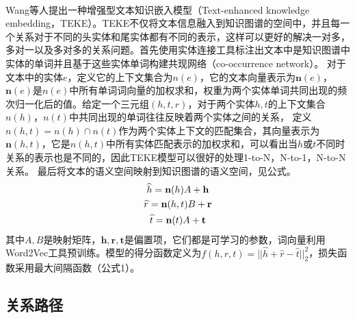\documentclass[twocolumn]{article}
\newcommand{\upcite}[1]{\textsuperscript{\textsuperscript{\cite{#1}}}}
\begin{document}
	Wang等人\upcite{TEKE}提出一种增强型文本知识嵌入模型（Text-enhanced knowledge embedding，TEKE）。TEKE不仅将文本信息融入到知识图谱的空间中，并且每一个关系对于不同的头实体和尾实体都有不同的表示，这样可以更好的解决一对多，多对一以及多对多的关系问题。首先使用实体连接工具标注出文本中是知识图谱中实体的单词并且基于这些实体单词构建共现网络（co-occurrence network）。
	对于文本中的实体$e$，定义它的上下文集合为$n(e)$，它的文本向量表示为$\textbf{n}(e)$，$\textbf{n}(e)$是$n(e)$中所有单词词向量的加权求和，权重为两个实体单词共同出现的频次归一化后的值。给定一个三元组$(h,t,r)$，对于两个实体$h,t$的上下文集合$n(h)$，$n(t)$中共同出现的单词往往反映着两个实体之间的关系，
	定义$n(h,t)=n(h)\cap n(t)$作为两个实体上下文的匹配集合，其向量表示为$\textbf{n}(h,t)$，它是$n(h,t)$中所有实体匹配表示的加权求和，可以看出当$h$或$t$不同时关系的表示也是不同的，因此TEKE模型可以很好的处理1-to-N，N-to-1，N-to-N关系。
	最后将文本的语义空间映射到知识图谱的语义空间，见公式。
	\begin{gather}
		\widehat{h}=\textbf{n}(h)A+\textbf{h} \notag \\
		\widehat{r}=\textbf{n}(h,t)B+\textbf{r} \\
		\widehat{t}=\textbf{n}(t)A+\textbf{t} \notag
	\end{gather}
	其中$A,B$是映射矩阵，$\textbf{h},\textbf{r},\textbf{t}$是偏置项，它们都是可学习的参数，词向量利用Word2Vec工具预训练。模型的得分函数定义为$f(h,r,t)=||\widehat{h}+\widehat{r}-\widehat{t}||_2^2$，损失函数采用最大间隔函数（公式1）。
	
	
\subsection{关系路径}
\end{document}
